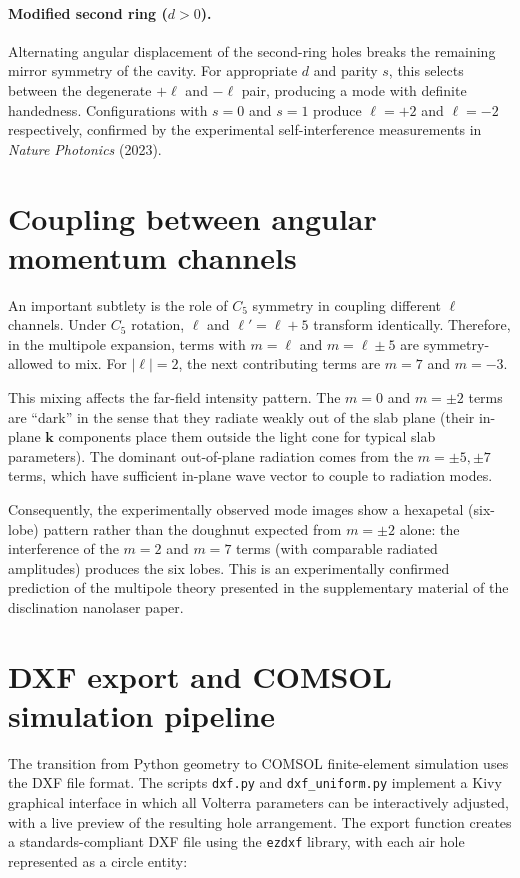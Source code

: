 \documentclass[12pt,a4paper,oneside]{book}
\theoremstyle{plain}
\theoremstyle{definition}
\theoremstyle{remark}
\newcommand{\vb}[1]{\bm{#1}}
\newcommand{\kvec}{\vb{k}}
\begin{document}
\paragraph{Modified second ring ($d > 0$).} Alternating angular displacement of the second-ring holes breaks the remaining mirror symmetry of the cavity. For appropriate $d$ and parity $s$, this selects between the degenerate $+\ell$ and $-\ell$ pair, producing a mode with definite handedness. Configurations with $s=0$ and $s=1$ produce $\ell = +2$ and $\ell = -2$ respectively, confirmed by the experimental self-interference measurements in \textit{Nature Photonics} (2023).

\section{Coupling between angular momentum channels}
\label{sec:c5-coupling}

An important subtlety is the role of $C_5$ symmetry in coupling different $\ell$ channels. Under $C_5$ rotation, $\ell$ and $\ell' = \ell + 5$ transform identically. Therefore, in the multipole expansion, terms with $m = \ell$ and $m = \ell \pm 5$ are symmetry-allowed to mix. For $|\ell|=2$, the next contributing terms are $m = 7$ and $m = -3$.

This mixing affects the far-field intensity pattern. The $m=0$ and $m=\pm 2$ terms are ``dark'' in the sense that they radiate weakly out of the slab plane (their in-plane $\kvec$ components place them outside the light cone for typical slab parameters). The dominant out-of-plane radiation comes from the $m = \pm 5, \pm 7$ terms, which have sufficient in-plane wave vector to couple to radiation modes.

Consequently, the experimentally observed mode images show a hexapetal (six-lobe) pattern rather than the doughnut expected from $m=\pm 2$ alone: the interference of the $m=2$ and $m=7$ terms (with comparable radiated amplitudes) produces the six lobes. This is an experimentally confirmed prediction of the multipole theory presented in the supplementary material of the disclination nanolaser paper.

\section{DXF export and COMSOL simulation pipeline}
\label{sec:dxf-comsol}

The transition from Python geometry to COMSOL finite-element simulation uses the DXF file format. The scripts \texttt{dxf.py} and \texttt{dxf\_uniform.py} implement a Kivy graphical interface in which all Volterra parameters can be interactively adjusted, with a live preview of the resulting hole arrangement. The export function creates a standards-compliant DXF file using the \texttt{ezdxf} library, with each air hole represented as a circle entity:
\end{document}

